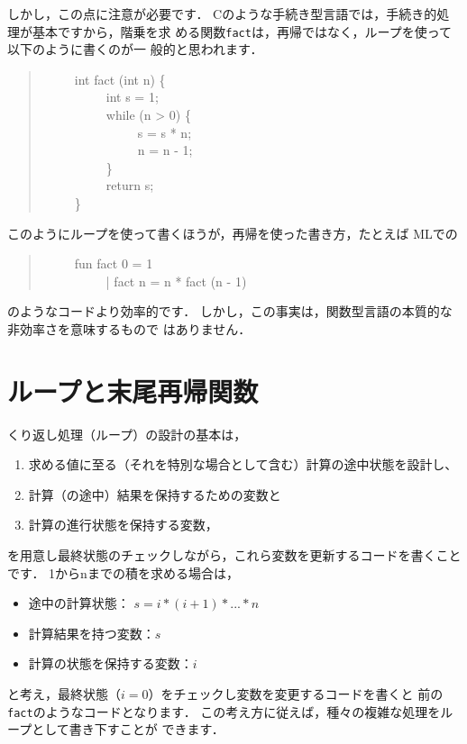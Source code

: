 \documentclass{jbook}
\newcommand{\myem}{\ \ \ \ \  }
\begin{document}
	しかし，この点に注意が必要です．
	Cのような手続き型言語では，手続き的処理が基本ですから，階乗を求
める関数{\tt fact}は，再帰ではなく，ループを使って以下のように書くのが一
般的と思われます．
\begin{tt}
\begin{quote}
\myem int fact (int n) \{\\
\myem\myem   int s = 1;\\
\myem\myem   while (n > 0) \{\\
\myem\myem\myem     s = s * n;\\
\myem\myem\myem     n = n - 1;\\
\myem\myem   \}\\
\myem\myem  return s;\\
\myem \}
\end{quote}
\end{tt}
	このようにループを使って書くほうが，再帰を使った書き方，たとえば
MLでの
\begin{tt}
\begin{quote}
\myem fun fact 0 = 1\\
\myem \ \ \ \ \ | fact n = n * fact (n - 1)
\end{quote}
\end{tt}
のようなコードより効率的です．
	しかし，この事実は，関数型言語の本質的な非効率さを意味するもので
はありません．

\section{ループと末尾再帰関数}
\label{sec:tutorialTailcall}

	くり返し処理（ループ）の設計の基本は，
\begin{enumerate}
\item 
求める値に至る（それを特別な場合として含む）計算の途中状態を設計し、
\item 
計算（の途中）結果を保持するための変数と
\item 
計算の進行状態を保持する変数，
\end{enumerate}
を用意し最終状態のチェックしながら，これら変数を更新するコードを書くこと
です．
	1からnまでの積を求める場合は，
\begin{itemize}
\item 
途中の計算状態：
$s = i * (i + 1) * ... * n$
\item 
計算結果を持つ変数：$s$
\item 
計算の状態を保持する変数：$i$
\end{itemize}
と考え，最終状態（$i = 0$）をチェックし変数を変更するコードを書くと
前の{\tt fact}のようなコードとなります．
	この考え方に従えば，種々の複雑な処理をループとして書き下すことが
できます．
\end{document}
